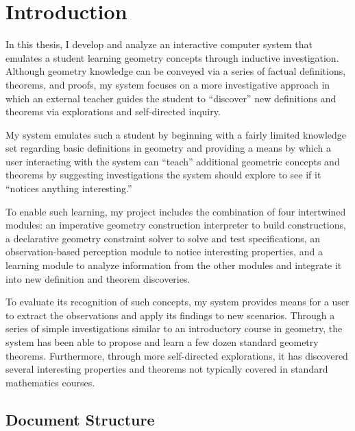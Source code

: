 \chapter{Introduction}
\label{chap:intro}

In this thesis, I develop and analyze an interactive computer system
that emulates a student learning geometry concepts through inductive
investigation. Although geometry knowledge can be conveyed via a
series of factual definitions, theorems, and proofs, my system focuses
on a more investigative approach in which an external teacher guides
the student to ``discover'' new definitions and theorems via
explorations and self-directed inquiry.

My system emulates such a student by beginning with a fairly limited
knowledge set regarding basic definitions in geometry and providing a
means by which a user interacting with the system can ``teach''
additional geometric concepts and theorems by suggesting
investigations the system should explore to see if it ``notices
anything interesting.''

To enable such learning, my project includes the combination of four
intertwined modules: an imperative geometry construction interpreter
to build constructions, a declarative geometry constraint solver to
solve and test specifications, an observation-based perception module
to notice interesting properties, and a learning module to analyze
information from the other modules and integrate it into new
definition and theorem discoveries.

To evaluate its recognition of such concepts, my system provides means
for a user to extract the observations and apply its findings to new
scenarios.  Through a series of simple investigations similar to an
introductory course in geometry, the system has been able to propose
and learn a few dozen standard geometry theorems. Furthermore, through
more self-directed explorations, it has discovered several interesting
properties and theorems not typically covered in standard mathematics
courses.

\section{Document Structure}

